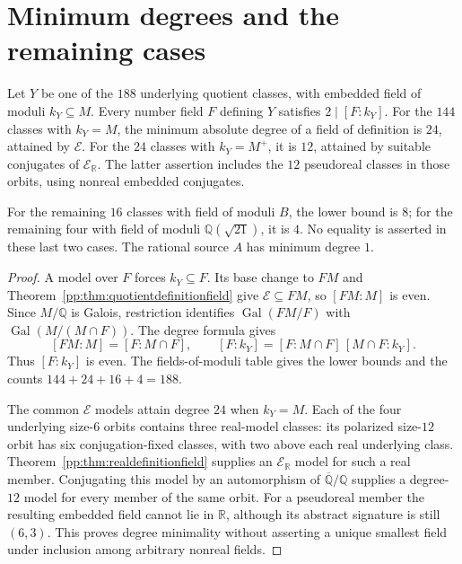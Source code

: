 \section{Minimum degrees and the remaining cases}
\begin{theorem}
\label{pp:thm:definitiondegrees}
Let $Y$ be one of the $188$ underlying quotient classes, with embedded
field of moduli $k_Y\subseteq M$. Every number field $F$ defining $Y$
satisfies $2\mid[F:k_Y]$. For the $144$ classes with $k_Y=M$, the
minimum absolute degree of a field of definition is $24$, attained
by $\mathcal E$. For the $24$ classes with $k_Y=M^+$, it is $12$,
attained by suitable conjugates of $\mathcal E_{\mathbb R}$.
The latter assertion includes the $12$ pseudoreal classes in those
orbits, using nonreal embedded conjugates.

For the remaining $16$ classes with field of moduli $B$, the lower
bound is $8$; for the remaining four with field of moduli
$\mathbb Q(\sqrt{21})$, it is $4$. No equality is asserted in
these last two cases. The rational source $A$ has minimum degree $1$.
\end{theorem}
\begin{proof}
A model over $F$ forces $k_Y\subseteq F$. Its base change to $FM$
and Theorem~\ref{pp:thm:quotientdefinitionfield} give
$\mathcal E\subseteq FM$, so $[FM:M]$ is even.
Since $M/\mathbb Q$ is Galois, restriction identifies
$\operatorname{Gal}(FM/F)$ with
$\operatorname{Gal}(M/(M\cap F))$. The degree formula gives
\[
 [FM:M]=[F:M\cap F],\qquad
 [F:k_Y]=[F:M\cap F]\,[M\cap F:k_Y].
\]
Thus $[F:k_Y]$ is even. The fields-of-moduli table gives the lower
bounds and the counts $144+24+16+4=188$.

The common $\mathcal E$ models attain degree $24$ when $k_Y=M$.
Each of the four underlying size-$6$ orbits contains three real-model
classes: its polarized size-$12$ orbit has six conjugation-fixed
classes, with two above each real underlying class.
Theorem~\ref{pp:thm:realdefinitionfield} supplies an
$\mathcal E_{\mathbb R}$ model for such a real member. Conjugating
this model by an automorphism of $\overline{\mathbb Q}/\mathbb Q$
supplies a degree-$12$ model for every member of the same orbit.
For a pseudoreal member the resulting embedded field cannot lie in
$\mathbb R$, although its abstract signature is still $(6,3)$.
This proves degree minimality without asserting a unique smallest
field under inclusion among arbitrary nonreal fields.
\end{proof}

